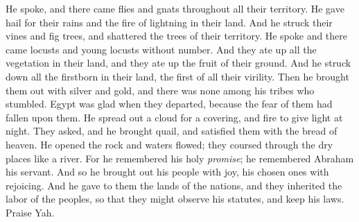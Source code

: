 \begin{biblechapter}
\verse He spoke, and there came flies 
and gnats throughout all their territory.
\verse He gave hail for their rains 
and the fire of lightning in their land.
\verse And he struck their vines and fig trees, 
and shattered the trees of their territory.
\verse He spoke and there came locusts 
and young locusts without number.
\verse And they ate up all the vegetation in their land, 
and they ate up the fruit of their ground.
\verse And he struck down all the firstborn in their land, 
the first of all their virility.
\verse Then he brought them out with silver and gold, 
and there was none among his tribes who stumbled.
\verse Egypt was glad when they departed, 
because the fear of them had fallen upon them.
\verse He spread out a cloud for a covering, 
and fire to give light at night.
\verse They asked, and he brought quail, 
and satisfied them with the bread of heaven.
\verse He opened the rock and waters flowed; 
they coursed through the dry places like a river.
\verse For he remembered his holy \textit{promise}; 
he remembered Abraham his servant.
\verse And so he brought out his people with joy, 
his chosen ones with rejoicing.
\verse And he gave to them the lands of the nations, 
and they inherited the labor of the peoples,
\verse so that they might observe his statutes, 
and keep his laws. 
Praise Yah.
\end{biblechapter}

